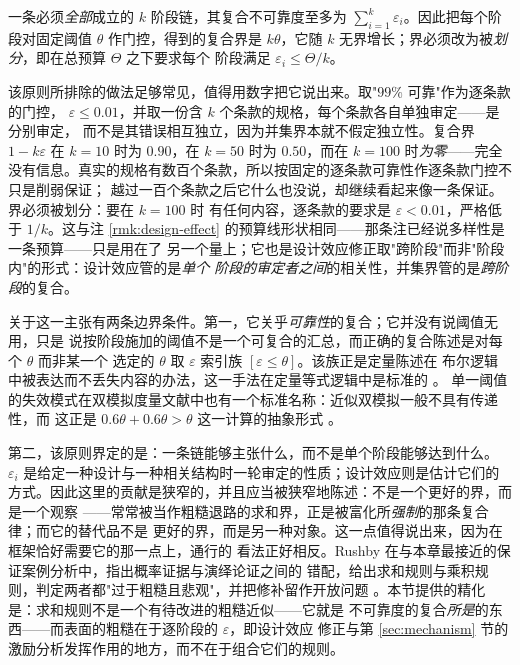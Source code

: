 \begin{principle}\label{pr:budget}
一条必须\emph{全部}成立的 $k$ 阶段链，其复合不可靠度至多为
$\sum_{i=1}^{k}\varepsilon_i$。因此把每个阶段对固定阈值 $\theta$ 作门控，得到的复合界是
$k\theta$，它随 $k$ 无界增长；界必须改为被\emph{划分}，即在总预算 $\Theta$ 之下要求每个
阶段满足 $\varepsilon_i \leq \Theta/k$。
\end{principle}

该原则所排除的做法足够常见，值得用数字把它说出来。取"$99\%$ 可靠"作为逐条款的门控，
$\varepsilon \leq 0.01$，并取一份含 $k$ 个条款的规格，每个条款各自单独审定——是分别审定，
而不是其错误相互独立，因为并集界本就不假定独立性。复合界 $1-k\varepsilon$
在 $k = 10$ 时为 $0.90$，在 $k = 50$ 时为 $0.50$，而在 $k = 100$ 时\emph{为零}——完全
没有信息。真实的规格有数百个条款，所以按固定的逐条款可靠性作逐条款门控不只是削弱保证；
越过一百个条款之后它什么也没说，却继续看起来像一条保证。界必须被划分：要在 $k = 100$ 时
有任何内容，逐条款的要求是 $\varepsilon < 0.01$，严格低于 $1/k$。这与注
\ref{rmk:design-effect} 的预算线形状相同——那条注已经说多样性是一条预算——只是用在了
另一个量上；它也是设计效应修正取"跨阶段"而非"阶段内"的形式：设计效应管的是\emph{单个
阶段的审定者之间}的相关性，并集界管的是\emph{跨阶段}的复合。

关于这一主张有两条边界条件。第一，它关乎\emph{可靠性}的复合；它并没有说阈值无用，只是
说按阶段施加的阈值不是一个可复合的汇总，而正确的复合陈述是对每个 $\theta$ 而非某一个
选定的 $\theta$ 取 $\varepsilon$ 索引族 $[\varepsilon \leq \theta]$。该族正是定量陈述在
布尔逻辑中被表达而不丢失内容的办法，这一手法在定量等式逻辑中是标准的 \cite{bacci2023}。
单一阈值的失效模式在双模拟度量文献中也有一个标准名称：近似双模拟一般不具有传递性，而
这正是 $0.6\theta + 0.6\theta > \theta$ 这一计算的抽象形式 \cite{gebler2013}。

第二，该原则界定的是：一条链能够主张什么，而不是单个阶段能够达到什么。
$\varepsilon_i$ 是给定一种设计与一种相关结构时一轮审定的性质；设计效应则是估计它们的
方式。因此这里的贡献是狭窄的，并且应当被狭窄地陈述：不是一个更好的界，而是一个观察
——常常被当作粗糙退路的求和界，正是被富化所\emph{强制}的那条复合律；而它的替代品不是
更好的界，而是另一种对象。这一点值得说出来，因为在框架恰好需要它的那一点上，通行的
看法正好相反。Rushby 在与本章最接近的保证案例分析中，指出概率证据与演绎论证之间的
错配，给出求和规则与乘积规则，判定两者都"过于粗糙且悲观"，并把修补留作开放问题
\cite{rushby2015}。本节提供的精化是：求和规则不是一个有待改进的粗糙近似——它就是
不可靠度的复合\emph{所是}的东西——而表面的粗糙在于逐阶段的 $\varepsilon$，即设计效应
修正与第 \ref{sec:mechanism} 节的激励分析发挥作用的地方，而不在于组合它们的规则。

